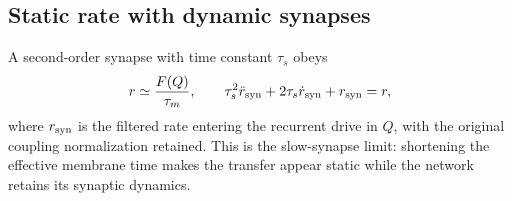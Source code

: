 \subsection{Static rate with dynamic synapses}
A second-order synapse with time constant $\tau_s$ obeys
\begin{equation}
r\simeq \frac{F(Q)}{\tau_m},\qquad
\tau_s^2\ddot r_{\rm syn}+2\tau_s\dot r_{\rm syn}+r_{\rm syn}=r,
\label{eq:slow_synapse}
\end{equation}
where $r_{\rm syn}$ is the filtered rate entering the recurrent drive in $Q$, with the original
coupling normalization retained. This is the slow-synapse limit: shortening the
effective membrane time makes the transfer appear static while the network retains
its synaptic dynamics.
